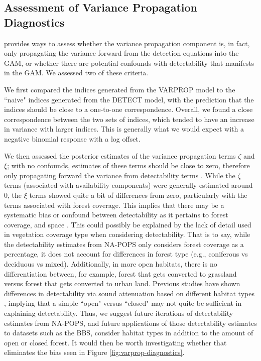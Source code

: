 \subsection{Assessment of Variance Propagation Diagnostics}

\par \citet{bravington_variance_2021} provides ways to assess whether the variance propagation component is, in fact, only propagating the variance forward from the detection equations into the GAM, or whether there are potential confounds with detectability that manifests in the GAM.
We assessed two of these criteria.

We first compared the indices generated from the VARPROP model to the ``naive" indices generated from the DETECT model, with the prediction that the indices should be close to a one-to-one correspondence.
Overall, we found a close correspondence between the two sets of indices, which tended to have an increase in variance with larger indices.
This is generally what we would expect with a negative binomial response with a log offset.

We then assessed the posterior estimates of the variance propagation terms $\zeta$ and $\xi$; with no confounds, estimates of these terms should be close to zero, therefore only propagating forward the variance from detectability terms \citep{bravington_variance_2021}.
While the $\zeta$ terms (associated with availability components) were generally estimated around 0, the $\xi$ terms showed quite a bit of differences from zero, particularly with the terms associated with forest coverage.
This implies that there may be a systematic bias or confound between detectability as it pertains to forest coverage, and space \citep{bravington_variance_2021}.
This could possibly be explained by the lack of detail used in vegetation coverage type when considering detectability.
That is to say, while the detectability estimates from NA-POPS only considers forest coverage as a percentage, it does not account for differences in forest type (e.g., coniferous vs deciduous vs mixed).
Additionally, in more open habitats, there is no differentiation between, for example, forest that gets converted to grassland versus forest that gets converted to urban land.
Previous studies have shown differences in detectability via sound attenuation based on different habitat types \citep{schieck_biased_1997}, implying that a simple ``open" versus ``closed" may not quite be sufficient in explaining detectability.
Thus, we suggest future iterations of detectability estimates from NA-POPS, and future applications of those detectability estimates to datasets such as the BBS, consider habitat types in addition to the amount of open or closed forest.
It would then be worth investigating whether that eliminates the bias seen in Figure \ref{fig:varprop-diagnostics}.

